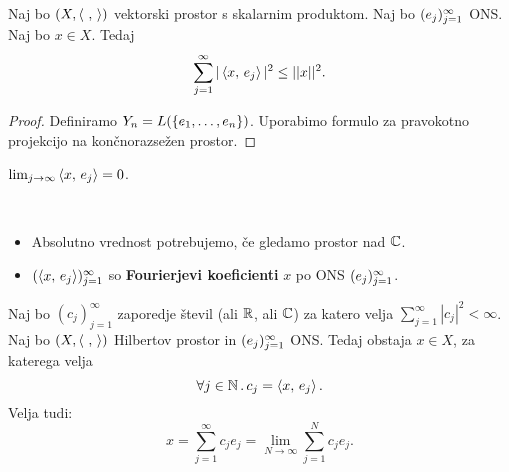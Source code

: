 \begin{trditev}
    Naj bo \((X, \left\langle \ , \,  \right\rangle)\) vektorski prostor s skalarnim produktom. Naj bo \((e_j)_{j=1}^\infty\) ONS. Naj bo \(x \in X\). Tedaj 
    \[\sum_{j=1}^{\infty}|\left\langle x, \, e_j \right\rangle|^2 \leq ||x||^2.\]  
\end{trditev}

\begin{proof}
    Definiramo \(Y_n = L(\left\{e_1, \ldots, e_n\right\})\). Uporabimo formulo za pravokotno projekcijo na končnorazsežen prostor.
\end{proof}

\begin{posledica}
    \(\lim_{j \to \infty} \left\langle x, \, e_j \right\rangle = 0\).
\end{posledica}

\begin{opomba} \
    \begin{itemize}
        \item Absolutno vrednost potrebujemo, če gledamo prostor nad \(\mathbb{C}\).
        \item \((\left\langle x, \, e_j \right\rangle)_{j = 1}^\infty\) so \textbf{Fourierjevi koeficienti} \(x\) po ONS \((e_j)_{j=1}^\infty\).
    \end{itemize}
\end{opomba}

\begin{trditev}
    Naj bo \((c_j)_{j=1}^\infty\) zaporedje števil (ali \(\mathbb{R}\), ali \(\mathbb{C}\)) za katero velja \(\sum_{j=1}^{\infty} |c_j|^2 < \infty\). Naj bo \((X, \left\langle \ , \,  \right\rangle)\) Hilbertov prostor in \((e_j)_{j=1}^\infty\) ONS. Tedaj obstaja \(x \in X\), za katerega velja 
    \[\forall j \in \mathbb{N} \,.\, c_j = \left\langle x, \, e_j \right\rangle.\]
    Velja tudi:
    \[x = \sum_{j = 1}^{\infty}c_je_j = \lim_{N \to \infty} \sum_{j=1}^{N}c_je_j.\]
\end{trditev}
